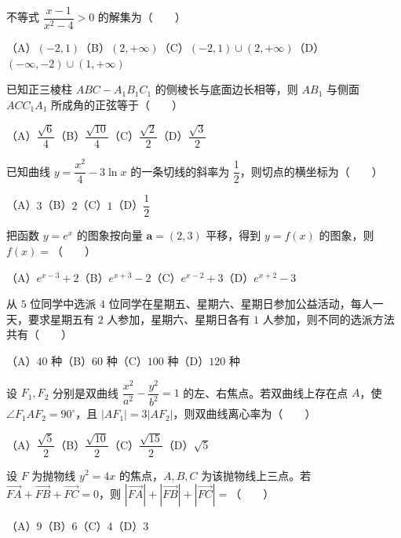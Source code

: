 \begin{question}
不等式 $\dfrac{x-1}{x^2-4}>0$ 的解集为\mbox{（　　）}

（A）$(-2,1)$\quad（B）$(2,+\infty)$\quad（C）$(-2,1)\cup(2,+\infty)$\quad（D）$(-\infty,-2)\cup(1,+\infty)$

\end{question}
\begin{question}
已知正三棱柱 $ABC-A_1B_1C_1$ 的侧棱长与底面边长相等，则 $AB_1$ 与侧面 $ACC_1A_1$ 所成角的正弦等于\mbox{（　　）}

（A）$\dfrac{\sqrt6}{4}$\quad（B）$\dfrac{\sqrt{10}}4$\quad（C）$\dfrac{\sqrt2}2$\quad（D）$\dfrac{\sqrt3}2$

\end{question}
\begin{question}
已知曲线 $y=\dfrac{x^2}{4}-3\ln x$ 的一条切线的斜率为 $\dfrac12$，则切点的横坐标为\mbox{（　　）}

（A）$3$\quad（B）$2$\quad（C）$1$\quad（D）$\dfrac12$

\end{question}
\begin{question}
把函数 $y=e^x$ 的图象按向量 $\boldsymbol a=(2,3)$ 平移，得到 $y=f(x)$ 的图象，则 $f(x)=$\mbox{（　　）}

（A）$e^{x-3}+2$\quad（B）$e^{x+3}-2$\quad（C）$e^{x-2}+3$\quad（D）$e^{x+2}-3$

\end{question}
\begin{question}
从 $5$ 位同学中选派 $4$ 位同学在星期五、星期六、星期日参加公益活动，每人一天，要求星期五有 $2$ 人参加，星期六、星期日各有 $1$ 人参加，则不同的选派方法共有\mbox{（　　）}

（A）$40$ 种\quad（B）$60$ 种\quad（C）$100$ 种\quad（D）$120$ 种

\end{question}
\begin{question}
设 $F_1,F_2$ 分别是双曲线 $\dfrac{x^2}{a^2}-\dfrac{y^2}{b^2}=1$ 的左、右焦点。若双曲线上存在点 $A$，使 $\angle F_1AF_2=90^\circ$，且 $|AF_1|=3|AF_2|$，则双曲线离心率为\mbox{（　　）}

（A）$\dfrac{\sqrt5}{2}$\quad（B）$\dfrac{\sqrt{10}}2$\quad（C）$\dfrac{\sqrt{15}}2$\quad（D）$\sqrt5$

\end{question}
\begin{question}
设 $F$ 为抛物线 $y^2=4x$ 的焦点，$A,B,C$ 为该抛物线上三点。若 $\overrightarrow{FA}+\overrightarrow{FB}+\overrightarrow{FC}=0$，则 $|\overrightarrow{FA}|+|\overrightarrow{FB}|+|\overrightarrow{FC}|=$\mbox{（　　）}

（A）$9$\quad（B）$6$\quad（C）$4$\quad（D）$3$

\end{question}

